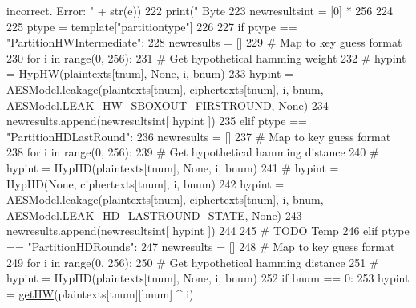 \begin{DoxyCode}
{{{       incorrect. Error: "} + str(e))
222                     print(\textcolor{stringliteral}{"         Byte %
223                     newresultsint = [0] * 256
224 
225                 ptype = template[\textcolor{stringliteral}{"partitiontype"}]
226 
227                 \textcolor{keywordflow}{if} ptype == \textcolor{stringliteral}{"PartitionHWIntermediate"}:
228                     newresults = []
229                     \textcolor{comment}{# Map to key guess format}
230                     \textcolor{keywordflow}{for} i \textcolor{keywordflow}{in} range(0, 256):
231                         \textcolor{comment}{# Get hypothetical hamming weight}
232                         \textcolor{comment}{# hypint = HypHW(plaintexts[tnum], None, i, bnum)}
233                         hypint = AESModel.leakage(plaintexts[tnum], ciphertexts[tnum], i, bnum, 
      AESModel.LEAK\_HW\_SBOXOUT\_FIRSTROUND, \textcolor{keywordtype}{None})
234                         newresults.append(newresultsint[ hypint ])
235                 \textcolor{keywordflow}{elif} ptype == \textcolor{stringliteral}{"PartitionHDLastRound"}:
236                     newresults = []
237                     \textcolor{comment}{# Map to key guess format}
238                     \textcolor{keywordflow}{for} i \textcolor{keywordflow}{in} range(0, 256):
239                         \textcolor{comment}{# Get hypothetical hamming distance}
240                         \textcolor{comment}{# hypint = HypHD(plaintexts[tnum], None, i, bnum)}
241                         \textcolor{comment}{# hypint = HypHD(None, ciphertexts[tnum], i, bnum)}
242                         hypint = AESModel.leakage(plaintexts[tnum], ciphertexts[tnum], i, bnum, 
      AESModel.LEAK\_HD\_LASTROUND\_STATE, \textcolor{keywordtype}{None})
243                         newresults.append(newresultsint[ hypint ])
244 
245                 \textcolor{comment}{# TODO Temp}
246                 \textcolor{keywordflow}{elif} ptype == \textcolor{stringliteral}{"PartitionHDRounds"}:
247                     newresults = []
248                     \textcolor{comment}{# Map to key guess format}
249                     \textcolor{keywordflow}{for} i \textcolor{keywordflow}{in} range(0, 256):
250                         \textcolor{comment}{# Get hypothetical hamming distance}
251                         \textcolor{comment}{# hypint = HypHD(plaintexts[tnum], None, i, bnum)}
252                         \textcolor{keywordflow}{if} bnum == 0:
253                             hypint = \hyperlink{namespacesoftware_1_1chipwhisperer_1_1analyzer_1_1attacks_1_1models_1_1AES128__8bit_ad7e775a7bb3510f159149dba221c7732}{getHW}(plaintexts[tnum][bnum] ^ i)
}}}
\end{DoxyCode}
